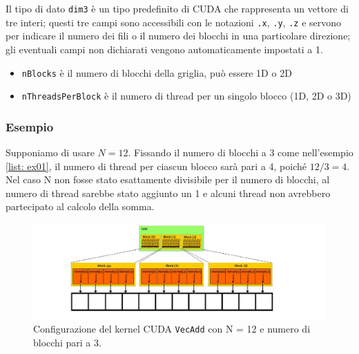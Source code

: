 \noindent Il tipo di dato \texttt{dim3} è un tipo predefinito di CUDA che rappresenta un vettore di tre interi; questi tre campi sono accessibili con le notazioni \texttt{.x}, \texttt{.y}, \texttt{.z} e servono per indicare il numero dei fili o il numero dei blocchi in una particolare direzione; gli eventuali campi non dichiarati vengono automaticamente impostati a 1.
\begin{itemize}
    \item \texttt{nBlocks} è il numero di blocchi della griglia, può essere 1D o 2D
    \item \texttt{nThreadsPerBlock} è il numero di thread per un singolo blocco (1D, 2D o 3D)
\end{itemize}

\subsubsection{Esempio}
\noindent Supponiamo di usare $N = 12$. Fissando il numero di blocchi a 3 come nell'esempio \ref{list: ex01}, il numero di thread per ciascun blocco sarà pari a 4, poiché $12 / 3 = 4$. Nel caso N non fosse stato esattamente divisibile per il numero di blocchi, al numero di thread sarebbe stato aggiunto un 1 e alcuni thread non avrebbero partecipato al calcolo della somma.

\begin{figure}[h!]
    \centering
    \includegraphics[scale=0.6]{img/kconf.png}
    \caption{Configurazione del kernel CUDA \texttt{VecAdd} con N = 12 e numero di blocchi pari a 3.}
\end{figure}